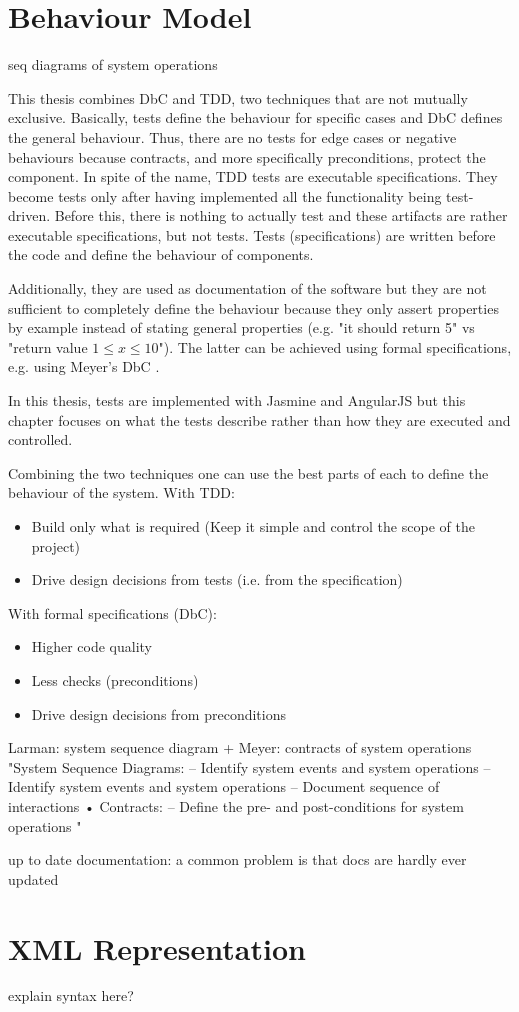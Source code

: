 \FloatBarrier

\section{Behaviour Model}
seq diagrams of system operations

This thesis combines \ac{DbC} and \ac{TDD}, two techniques that are not mutually exclusive.
Basically, tests define the behaviour for specific cases and \ac{DbC} defines the general behaviour. 
Thus, there are no tests for edge cases or negative behaviours because contracts, and more specifically preconditions, protect the component.
In spite of the name, \ac{TDD} tests are executable specifications.
They become tests only after having implemented all the functionality being test-driven.
Before this, there is nothing to actually test and these artifacts are rather executable specifications, but not tests.
Tests (specifications) are written before the code and define the behaviour of components.

Additionally, they are used as documentation of the software but they are not sufficient to completely define the behaviour because they only assert properties by example instead of stating general properties (e.g. "it should return 5" vs "return value $1 \leq x \leq 10$"). The latter can be achieved using formal specifications,
e.g. using Meyer's \ac{DbC} \cite{Baumeister:2004}.

In this thesis, tests are implemented with Jasmine and AngularJS but this chapter focuses on what the tests describe rather than how they are executed and controlled.

Combining the two techniques one can use the best parts of each to define the behaviour of the system.
With \ac{TDD}:
\begin{itemize}
    \item Build only what is required (Keep it simple and control the scope of the project)
    \item Drive design decisions from tests (i.e. from the specification)
\end{itemize}

With formal specifications (\ac{DbC}):
\begin{itemize}
    \item Higher code quality
    \item Less checks (preconditions)
    \item Drive design decisions from preconditions
\end{itemize}


Larman: system sequence diagram + Meyer: contracts of system operations
"System Sequence Diagrams:
–
Identify system events and system operations
–
Identify system events and system operations
– Document sequence of interactions
• Contracts:
– Define the pre- and post-conditions for system
operations "

up to date documentation: a common problem is that docs are hardly ever updated

\section{XML Representation}
explain syntax here?